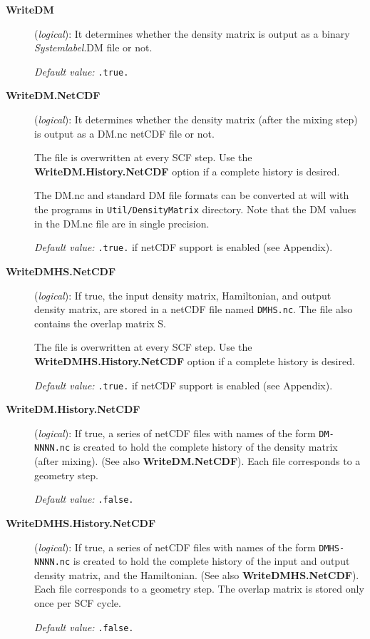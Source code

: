 \documentclass[11pt]{article}
\begin{document}
\begin{description}
\item[{\bf WriteDM}] ({\it logical}): 
 It determines whether the density matrix
is output as a binary {\it Systemlabel}.DM file or not.

{\it Default value:} {\tt .true.}

\item[{\bf WriteDM.NetCDF}] ({\it logical}): 
 It determines whether the density matrix
(after the mixing step) is output as a DM.nc netCDF file or not.

The file is overwritten at every SCF step. Use the {\bf
WriteDM.History.NetCDF} option if a complete history is desired.

The DM.nc and standard DM file formats can be converted at will with
the programs in {\tt Util/DensityMatrix} directory. Note that the
DM values in the DM.nc file are in single precision.

{\it Default value:} {\tt .true.} if netCDF support is enabled (see Appendix).

\item[{\bf WriteDMHS.NetCDF}] ({\it logical}): 
If true, the input density matrix, Hamiltonian, and output density matrix, are stored in a netCDF file
named {\tt DMHS.nc}. The file also contains the overlap matrix S.

The file is overwritten at every SCF step. Use the {\bf
  WriteDMHS.History.NetCDF} option if a complete history is desired.

{\it Default value:} {\tt .true.} if netCDF support is enabled (see Appendix).

\item[{\bf WriteDM.History.NetCDF}] ({\it logical}):
 If
true, a series of netCDF files with names of the form {\tt DM-NNNN.nc}
is created to hold the complete history of the density matrix (after
mixing).  (See also {\bf WriteDM.NetCDF}). Each file corresponds to a
geometry step.

{\it Default value:} {\tt .false.}

\item[{\bf WriteDMHS.History.NetCDF}] ({\it logical}):
 If true, a series of netCDF
files with names of the form {\tt DMHS-NNNN.nc} is created to hold the
complete history of the input and output density matrix, and the
Hamiltonian.  (See also {\bf WriteDMHS.NetCDF}). Each file corresponds
to a geometry step. The overlap matrix is stored only once per SCF
cycle.

{\it Default value:} {\tt .false.}

\end{description}
\end{document}
